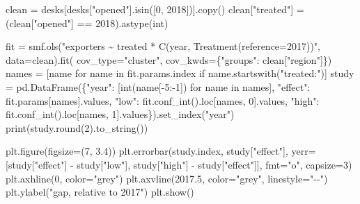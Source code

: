 \documentclass[
  letterpaper,
  10pt,
  twoside,
  openright,
  numbers=noenddot,
  chapterprefix=true]{scrbook}
\newenvironment{Shaded}{}{}
\newcommand{\BuiltInTok}[1]{\textcolor[rgb]{0.84,0.23,0.29}{#1}}
\newcommand{\ControlFlowTok}[1]{\textcolor[rgb]{0.84,0.23,0.29}{#1}}
\newcommand{\DecValTok}[1]{\textcolor[rgb]{0.00,0.36,0.77}{#1}}
\newcommand{\FloatTok}[1]{\textcolor[rgb]{0.00,0.36,0.77}{#1}}
\newcommand{\KeywordTok}[1]{\textcolor[rgb]{0.84,0.23,0.29}{#1}}
\newcommand{\NormalTok}[1]{\textcolor[rgb]{0.14,0.16,0.18}{#1}}
\newcommand{\OperatorTok}[1]{\textcolor[rgb]{0.14,0.16,0.18}{#1}}
\newcommand{\StringTok}[1]{\textcolor[rgb]{0.01,0.18,0.38}{#1}}
\begin{document}
\begin{Shaded}
\begin{Highlighting}[]
\NormalTok{clean }\OperatorTok{=}\NormalTok{ desks[desks[}\StringTok{"opened"}\NormalTok{].isin([}\DecValTok{0}\NormalTok{, }\DecValTok{2018}\NormalTok{])].copy()}
\NormalTok{clean[}\StringTok{"treated"}\NormalTok{] }\OperatorTok{=}\NormalTok{ (clean[}\StringTok{"opened"}\NormalTok{] }\OperatorTok{==} \DecValTok{2018}\NormalTok{).astype(}\BuiltInTok{int}\NormalTok{)}

\NormalTok{fit }\OperatorTok{=}\NormalTok{ smf.ols(}\StringTok{"exporters \textasciitilde{} treated * C(year, Treatment(reference=2017))"}\NormalTok{, data}\OperatorTok{=}\NormalTok{clean).fit(}
\NormalTok{    cov\_type}\OperatorTok{=}\StringTok{"cluster"}\NormalTok{, cov\_kwds}\OperatorTok{=}\NormalTok{\{}\StringTok{"groups"}\NormalTok{: clean[}\StringTok{"region"}\NormalTok{]\})}
\NormalTok{names }\OperatorTok{=}\NormalTok{ [name }\ControlFlowTok{for}\NormalTok{ name }\KeywordTok{in}\NormalTok{ fit.params.index }\ControlFlowTok{if}\NormalTok{ name.startswith(}\StringTok{"treated:"}\NormalTok{)]}
\NormalTok{study }\OperatorTok{=}\NormalTok{ pd.DataFrame(\{}\StringTok{"year"}\NormalTok{: [}\BuiltInTok{int}\NormalTok{(name[}\OperatorTok{{-}}\DecValTok{5}\NormalTok{:}\OperatorTok{{-}}\DecValTok{1}\NormalTok{]) }\ControlFlowTok{for}\NormalTok{ name }\KeywordTok{in}\NormalTok{ names],}
                      \StringTok{"effect"}\NormalTok{: fit.params[names].values,}
                      \StringTok{"low"}\NormalTok{: fit.conf\_int().loc[names, }\DecValTok{0}\NormalTok{].values,}
                      \StringTok{"high"}\NormalTok{: fit.conf\_int().loc[names, }\DecValTok{1}\NormalTok{].values\}).set\_index(}\StringTok{"year"}\NormalTok{)}
\BuiltInTok{print}\NormalTok{(study.}\BuiltInTok{round}\NormalTok{(}\DecValTok{2}\NormalTok{).to\_string())}

\NormalTok{plt.figure(figsize}\OperatorTok{=}\NormalTok{(}\DecValTok{7}\NormalTok{, }\FloatTok{3.4}\NormalTok{))}
\NormalTok{plt.errorbar(study.index, study[}\StringTok{"effect"}\NormalTok{], yerr}\OperatorTok{=}\NormalTok{[study[}\StringTok{"effect"}\NormalTok{] }\OperatorTok{{-}}\NormalTok{ study[}\StringTok{"low"}\NormalTok{],}
\NormalTok{             study[}\StringTok{"high"}\NormalTok{] }\OperatorTok{{-}}\NormalTok{ study[}\StringTok{"effect"}\NormalTok{]], fmt}\OperatorTok{=}\StringTok{"o"}\NormalTok{, capsize}\OperatorTok{=}\DecValTok{3}\NormalTok{)}
\NormalTok{plt.axhline(}\DecValTok{0}\NormalTok{, color}\OperatorTok{=}\StringTok{"grey"}\NormalTok{)}
\NormalTok{plt.axvline(}\FloatTok{2017.5}\NormalTok{, color}\OperatorTok{=}\StringTok{"grey"}\NormalTok{, linestyle}\OperatorTok{=}\StringTok{"{-}{-}"}\NormalTok{)}
\NormalTok{plt.ylabel(}\StringTok{"gap, relative to 2017"}\NormalTok{)}
\NormalTok{plt.show()}
\end{Highlighting}
\end{Shaded}
\end{document}
